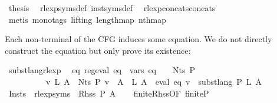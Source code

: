 \begin{isabellebody}
\ {\isacharquery}{\kern0pt}thesis\ \isamarkupfalse%
\ rlexp{\isacharunderscore}{\kern0pt}syms{\isacharunderscore}{\kern0pt}def\ inst{\isacharunderscore}{\kern0pt}syms{\isacharunderscore}{\kern0pt}def\ \isamarkupfalse%
\ rlexp{\isacharunderscore}{\kern0pt}concats{\isacharunderscore}{\kern0pt}concats\isanewline
\ \ \ \ \isamarkupfalse%
\ {\isacharparenleft}{\kern0pt}metis\ {\isacharparenleft}{\kern0pt}mono{\isacharunderscore}{\kern0pt}tags{\isacharcomma}{\kern0pt}\ lifting{\isacharparenright}{\kern0pt}\ length{\isacharunderscore}{\kern0pt}map\ nth{\isacharunderscore}{\kern0pt}map{\isacharparenright}{\kern0pt}\isanewline
{}\isamarkupfalse%
%
\endisatagproof
{\isafoldproof}%
%
\isadelimproof
%
\endisadelimproof
%
\begin{isamarkuptext}%
Each non-terminal of the CFG induces some  equation. We do not directly construct
the equation but only prove its existence:%
\end{isamarkuptext}\isamarkuptrue%
\isamarkupfalse%
\ subst{\isacharunderscore}{\kern0pt}lang{\isacharunderscore}{\kern0pt}rlexp{\isacharcolon}{\kern0pt}\isanewline
\ \ {\isachardoublequoteopen}{\isasymexists}eq{\isachardot}{\kern0pt}\ reg{\isacharunderscore}{\kern0pt}eval\ eq\ {\isasymand}\ vars\ eq\ {\isasymsubseteq}\ {\isasymgamma}{\isacharprime}{\kern0pt}\ {\isacharbackquote}{\kern0pt}\ Nts\ P\isanewline
\ \ \ \ \ \ \ \ \ {\isasymand}\ {\isacharparenleft}{\kern0pt}{\isasymforall}v\ L{\isachardot}{\kern0pt}\ {\isacharparenleft}{\kern0pt}{\isasymforall}A\ {\isasymin}\ Nts\ P{\isachardot}{\kern0pt}\ v\ {\isacharparenleft}{\kern0pt}{\isasymgamma}{\isacharprime}{\kern0pt}\ A{\isacharparenright}{\kern0pt}\ {\isacharequal}{\kern0pt}\ L\ A{\isacharparenright}{\kern0pt}\ {\isasymlongrightarrow}\ eval\ eq\ v\ {\isacharequal}{\kern0pt}\ subst{\isacharunderscore}{\kern0pt}lang\ P\ L\ A{\isacharparenright}{\kern0pt}{\isachardoublequoteclose}\isanewline
%
\isadelimproof
%
\endisadelimproof
%
\isatagproof
{}\isamarkupfalse%
\ {\isacharminus}{\kern0pt}\isanewline
\ \ \isamarkupfalse%
\ {\isacharquery}{\kern0pt}Insts\ {\isacharequal}{\kern0pt}\ {\isachardoublequoteopen}rlexp{\isacharunderscore}{\kern0pt}syms\ {\isacharbackquote}{\kern0pt}\ {\isacharparenleft}{\kern0pt}Rhss\ P\ A{\isacharparenright}{\kern0pt}{\isachardoublequoteclose}\isanewline
\ \ \isamarkupfalse%
\ finite{\isacharunderscore}{\kern0pt}Rhss{\isacharbrackleft}{\kern0pt}OF\ finite{\isacharunderscore}{\kern0pt}P{\isacharbrackright}{\kern0pt}\ \isamarkupfalse%

\end{isabellebody}
